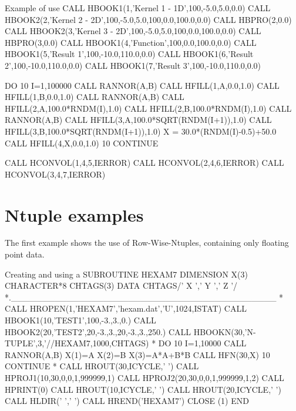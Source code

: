 \begin{XMPt}{Example of use}
      CALL HBOOK1(1,'Kernel 1 - 1D',100,-5.0,5.0,0.0)
      CALL HBOOK2(2,'Kernel 2 - 2D',100,-5.0,5.0,100,0.0,100.0,0.0)
      CALL HBPRO(2,0.0)
      CALL HBOOK2(3,'Kernel 3 - 2D',100,-5.0,5.0,100,0.0,100.0,0.0)
      CALL HBPRO(3,0.0)
      CALL HBOOK1(4,'Function',100,0.0,100.0,0.0)
      CALL HBOOK1(5,'Result 1',100,-10.0,110.0,0.0)
      CALL HBOOK1(6,'Result 2',100,-10.0,110.0,0.0)
      CALL HBOOK1(7,'Result 3',100,-10.0,110.0,0.0)

      DO 10 I=1,100000
        CALL RANNOR(A,B)
        CALL HFILL(1,A,0.0,1.0)
        CALL HFILL(1,B,0.0,1.0)
        CALL RANNOR(A,B)
        CALL HFILL(2,A,100.0*RNDM(I),1.0)
        CALL HFILL(2,B,100.0*RNDM(I),1.0)
        CALL RANNOR(A,B)
        CALL HFILL(3,A,100.0*SQRT(RNDM(I+1)),1.0)
        CALL HFILL(3,B,100.0*SQRT(RNDM(I+1)),1.0)
        X = 30.0*(RNDM(I)-0.5)+50.0
        CALL HFILL(4,X,0.0,1.0)
   10 CONTINUE

      CALL HCONVOL(1,4,5,IERROR)
      CALL HCONVOL(2,4,6,IERROR)
      CALL HCONVOL(3,4,7,IERROR)
\end{XMPt}


\finalnewpage%

\section{Ntuple examples}

The first example shows the use of Row-Wise-Ntuples, containing
only floating point data.

\newpage
\begin{XMPt}{Creating and using a \RWN{}}\setlength{\baselineskip}{.96\baselineskip}
      SUBROUTINE HEXAM7
      DIMENSION X(3)
      CHARACTER*8 CHTAGS(3)
      DATA CHTAGS/'   X   ','   Y   ','   Z   '/
*.___________________________________________
*
      CALL HROPEN(1,'HEXAM7','hexam.dat','U',1024,ISTAT)
      CALL HBOOK1(10,'TEST1',100,-3.,3.,0.)
      CALL HBOOK2(20,'TEST2',20,-3.,3.,20,-3.,3.,250.)
      CALL HBOOKN(30,'N-TUPLE',3,'//HEXAM7,1000,CHTAGS)
*
      DO 10 I=1,10000
         CALL RANNOR(A,B)
         X(1)=A
         X(2)=B
         X(3)=A*A+B*B
         CALL HFN(30,X)
  10  CONTINUE
*
      CALL HROUT(30,ICYCLE,' ')
      CALL HPROJ1(10,30,0,0,1,999999,1)
      CALL HPROJ2(20,30,0,0,1,999999,1,2)
      CALL HPRINT(0)
      CALL HROUT(10,ICYCLE,' ')
      CALL HROUT(20,ICYCLE,' ')
      CALL HLDIR(' ',' ')
      CALL HREND('HEXAM7')
      CLOSE (1)
      END
\end{XMPt}

